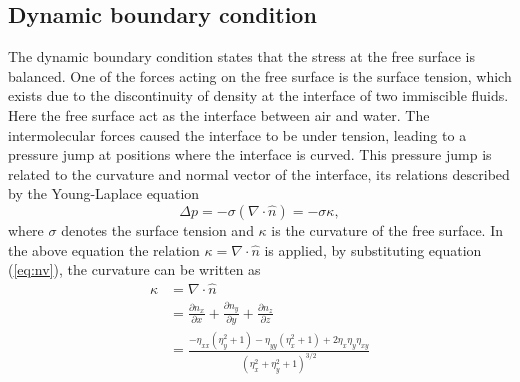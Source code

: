 \subsection{Dynamic boundary condition}
The dynamic boundary condition states that the stress at the free surface is balanced. One of the forces acting on the free surface is the surface tension, which exists due to the discontinuity of density at the interface of two immiscible fluids. Here the free surface act as the interface between air and water. The intermolecular forces caused the interface to be under tension, leading to a pressure jump at positions where the interface is curved. This pressure jump is related to the curvature and normal vector of the interface, its relations described by the Young-Laplace equation
\begin{equation}
    \Delta p = -\sigma (\nabla\cdot\hat{n})=-\sigma\kappa,
\end{equation}
where $\sigma$ denotes the surface tension and $\kappa$ is the curvature of the free surface. In the above equation the relation $\kappa=\nabla\cdot\hat{n}$ is applied, by substituting equation (\ref{eq:nv}), the curvature can be written as
\begin{equation}
    \begin{split}
        \kappa &=\nabla \cdot \hat{n} \\&=\frac{\partial n_{x}}{\partial x} +\frac{\partial n_{y}}{\partial y} +\frac{\partial n_{z}}{\partial z} \\&=\frac{-\eta _{xx}\left( \eta _{y}^{2} +1\right) -\eta _{yy}\left( \eta _{x}^{2} +1\right) +2\eta _{x} \eta _{y} \eta _{xy}}{\left( \eta _{x}^{2} +\eta _{y}^{2} +1\right)^{3/2}}
    \end{split}
    \label{eq:kappa}
\end{equation}

